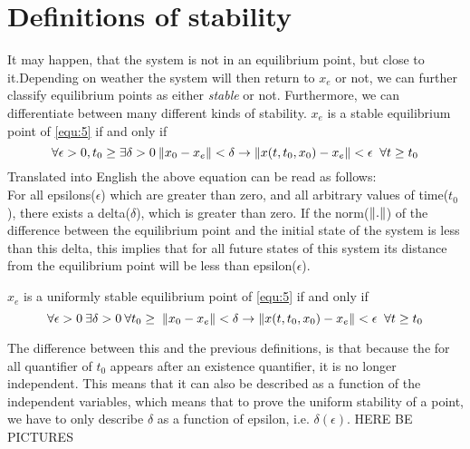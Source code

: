 \section{Definitions of stability}
It may happen, that the system is not in an equilibrium point, but close to it.Depending on weather the system will then return to $x_e$ or not, we can further classify equilibrium points as either  \textit{stable} or  not. Furthermore, we can differentiate between many different kinds of stability.
{
    $x_e$ is a stable equilibrium point of  \ref{equ:5} if and only if \\
    \begin{equation}
        \label{dfn:stab_eq_pt}
        \forall \epsilon > 0, t_0 \ge \exists \delta > 0 \: \lVert x_0-x_e\rVert < \delta \rightarrow \lVert x(t,t_0,x_0) - x_e\rVert < \epsilon \;\; \forall t \ge t_0   
    \end{equation}
    Translated into English the above equation can be read as follows:\\
    For all epsilons($\epsilon$) which are greater than zero, and all arbitrary values of time($t_0$), there exists a delta($\delta$), which is greater than zero. If the norm($\lVert.\rVert$) of the difference between the equilibrium point and the initial state of the system is less than this delta, this implies that for all future states of this system its distance from the equilibrium point will be less than epsilon($\epsilon$).\\
}

{
    $x_e$ is a uniformly stable equilibrium point of  \ref{equ:5} if and only if \\
    \begin{equation}
        \label{dfn:ustab_eq_pt}
        \forall \epsilon > 0\: \exists \delta > 0\: \forall t_0 \ge  \; \lVert x_0-x_e\rVert < \delta \rightarrow \lVert x(t,t_0,x_0) - x_e\rVert < \epsilon \;\; \forall t \ge t_0   
    \end{equation}

    \nt
    {
    
        The difference between this and the previous definitions, is that because the for all quantifier of $t_0$ appears after an existence quantifier, it is no longer independent. This means that it can also be described as a function of the independent variables, which means that to prove the uniform stability of a point, we have to only describe $\delta$ as a function of epsilon, i.e.  $\delta(\epsilon)$.  
        HERE BE PICTURES
    }


}

